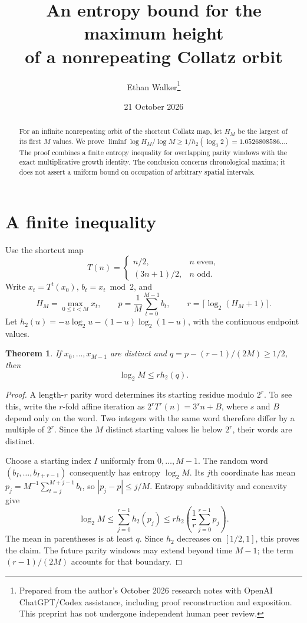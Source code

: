 \documentclass[11pt]{article}
\title{An entropy bound for the maximum height\\of a nonrepeating Collatz orbit}
\author{Ethan Walker\thanks{Prepared from the author's October 2026 research notes with OpenAI ChatGPT/Codex assistance, including proof reconstruction and exposition. This preprint has not undergone independent human peer review.}}
\date{21 October 2026}
\newtheorem{theorem}{Theorem}
\newcommand{\hh}{h_2}
\begin{document}
\maketitle
\begin{abstract}
For an infinite nonrepeating orbit of the shortcut Collatz map, let $H_M$ be the largest of its first $M$ values. We prove
$\liminf \log H_M/\log M\ge 1/h_2(\log_3 2)=1.0526808586\ldots$.
The proof combines a finite entropy inequality for overlapping parity windows with the exact multiplicative growth identity. The conclusion concerns chronological maxima; it does not assert a uniform bound on occupation of arbitrary spatial intervals.
\end{abstract}

\section{A finite inequality}
Use the shortcut map
\[
T(n)=\begin{cases}n/2,&n\text{ even},\\(3n+1)/2,&n\text{ odd}.\end{cases}
\]
Write $x_t=T^t(x_0)$, $b_t=x_t\bmod 2$, and
\[
H_M=\max_{0\le t<M}x_t,\qquad
p=\frac1M\sum_{t=0}^{M-1}b_t,\qquad
r=\lceil\log_2(H_M+1)\rceil.
\]
Let $\hh(u)=-u\log_2u-(1-u)\log_2(1-u)$, with the continuous endpoint values.

\begin{theorem}\label{finite}
If $x_0,\ldots,x_{M-1}$ are distinct and
$q=p-(r-1)/(2M)\ge 1/2$, then
\[
\log_2 M\le r\hh(q).
\]
\end{theorem}
\begin{proof}
A length-$r$ parity word determines its starting residue modulo $2^r$. To see this, write the $r$-fold affine iteration as
$2^rT^r(n)=3^s n+B$, where $s$ and $B$ depend only on the word. Two integers with the same word therefore differ by a multiple of $2^r$.
Since the $M$ distinct starting values lie below $2^r$, their words are distinct.

Choose a starting index $I$ uniformly from $0,\ldots,M-1$. The random word
$(b_I,\ldots,b_{I+r-1})$ consequently has entropy $\log_2 M$.
Its $j$th coordinate has mean
$p_j=M^{-1}\sum_{t=j}^{M+j-1}b_t$, so $|p_j-p|\le j/M$.
Entropy subadditivity and concavity give
\[
\log_2M\le\sum_{j=0}^{r-1}\hh(p_j)
\le r\hh\!\left(\frac1r\sum_{j=0}^{r-1}p_j\right).
\]
The mean in parentheses is at least $q$. Since $\hh$ decreases on $[1/2,1]$, this proves the claim. The future parity windows may extend beyond time $M-1$; the term $(r-1)/(2M)$ accounts for that boundary.
\end{proof}
\end{document}
